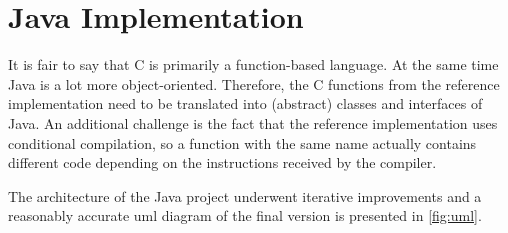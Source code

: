 \section{Java Implementation}
\label{sec:java-implementation}

It is fair to say that C is primarily a function-based language. At the same time Java is a lot more object-oriented. Therefore, the C functions from the reference implementation need to be translated into (abstract) classes and interfaces of Java. An additional challenge is the fact that the reference implementation uses conditional compilation, so a function with the same name actually contains different code depending on the instructions received by the compiler.

The architecture of the Java project underwent iterative improvements and a reasonably accurate \gls{uml} diagram of the final version is presented in \autoref{fig:uml}.


